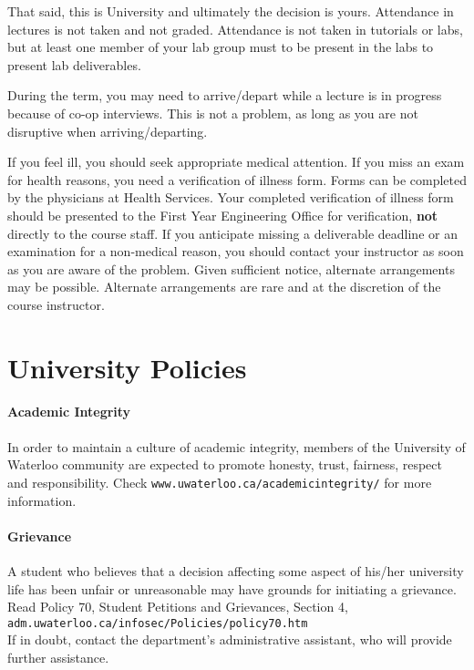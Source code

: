 \documentclass[letterpaper,10pt]{article}
\begin{document}
That said, this is University and ultimately the decision is yours. Attendance in lectures is not taken and not graded. Attendance is not taken in tutorials or labs, but at least one member of your lab group must to be present in the labs to present lab deliverables.

During the term, you may need to arrive/depart while a lecture is in progress because of co-op interviews. This is not a problem, as long as you are not disruptive when arriving/departing.

If you feel ill, you should seek appropriate medical attention. If you miss an exam for health reasons, you need a verification of illness form. Forms can be completed by the physicians at Health Services. Your completed verification of illness form should be presented to the First Year Engineering Office for verification, \textbf{not} directly to the course staff. If you anticipate missing a deliverable deadline or an examination for a non-medical reason, you should contact your instructor as soon as you are aware of the problem. Given sufficient notice, alternate arrangements may be possible. Alternate arrangements are rare and at the discretion of the course instructor.


\section*{University Policies}

\paragraph{Academic Integrity}
In order to maintain a culture of academic integrity, members of the University of Waterloo community are expected to promote honesty, trust, fairness, respect and responsibility. Check \texttt{www.uwaterloo.ca/academicintegrity/} for more information.

\paragraph{Grievance}
A student who believes that a decision affecting some aspect of his/her university life has been unfair or unreasonable may have grounds for initiating a grievance. Read Policy 70, Student Petitions and Grievances, Section 4, \texttt{adm.uwaterloo.ca/infosec/Policies/policy70.htm} \\
If in doubt, contact the department's administrative assistant, who will provide further assistance.
\end{document}

